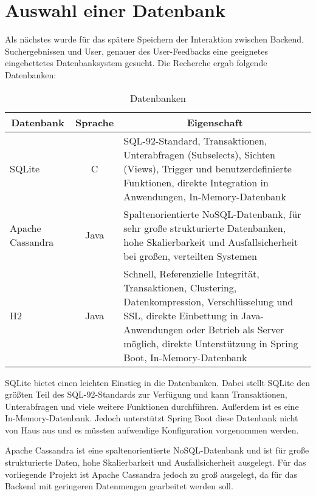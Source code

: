 \section{Auswahl einer Datenbank}
Als nächstes wurde für das spätere Speichern der Interaktion zwischen Backend, Suchergebnissen und User, genauer des User-Feedbacks eine geeignetes eingebettetes Datenbanksystem gesucht. 
Die Recherche ergab folgende Datenbanken:

\begin{table}[h!]
	\centering
	
	\begin{tabularx}{\textwidth}{|l|c|X|}
		
		\hline
		\multicolumn{1}{|c|}{{\textbf{Datenbank}}} & \multicolumn{1}{c|}{{\textbf{Sprache}}} & \multicolumn{1}{c|}{{\textbf{Eigenschaft}}} \\
		\hline	     
		SQLite & C & SQL-92-Standard,  Transaktionen, Unterabfragen (Subselects), Sichten (Views), Trigger und benutzerdefinierte Funktionen, direkte Integration in Anwendungen, In-Memory-Datenbank \\
		\hline
		Apache Cassandra & Java & Spaltenorientierte NoSQL-Datenbank, für sehr große strukturierte Datenbanken, hohe Skalierbarkeit und Ausfallsicherheit bei großen, verteilten Systemen \\
		\hline
		H2 & Java &   Schnell, Referenzielle Integrität, Transaktionen, Clustering, Datenkompression, Verschlüsselung und SSL, direkte Einbettung in Java-Anwendungen oder Betrieb als Server möglich, direkte Unterstützung in Spring Boot, In-Memory-Datenbank \\
		\hline
		
	\end{tabularx}
	\caption{Datenbanken}
	\label{tbl:dbs}
\end{table}

SQLite bietet einen leichten Einstieg in die Datenbanken.
Dabei stellt SQLite den größten Teil des SQL-92-Standards zur Verfügung und kann Transaktionen, Unterabfragen und viele weitere Funktionen durchführen.
Außerdem ist es eine In-Memory-Datenbank. 
Jedoch unterstützt Spring Boot diese Datenbank nicht von Haus aus und es müssten aufwendige Konfiguration vorgenommen werden.

Apache Cassandra ist eine spaltenorientierte NoSQL-Datenbank und ist für große strukturierte Daten, hohe Skalierbarkeit und Ausfallsicherheit ausgelegt.
Für das vorliegende Projekt ist Apache Cassandra jedoch zu groß ausgelegt, da für das Backend mit geringeren Datenmengen gearbeitet werden soll.

